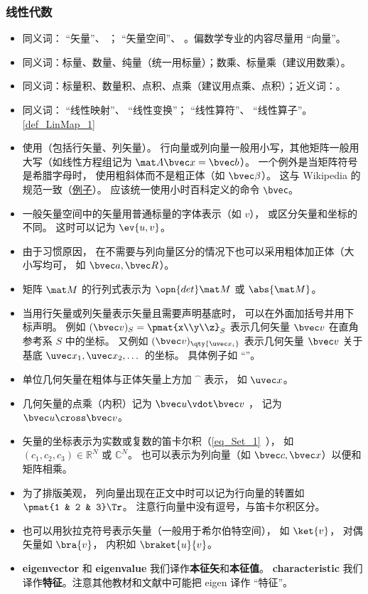 \subsubsection{线性代数}
\begin{itemize}
\item 同义词： “矢量”、 ； “矢量空间”、 。偏数学专业的内容尽量用 “向量”。
\item 同义词：标量、数量、纯量（统一用标量）；数乘、标量乘（建议用数乘）。
\item 同义词：标量积、数量积、点积、点乘（建议用点乘、点积）；近义词：。
\item 同义词： “线性映射”、 “线性变换”； “线性算符”、 “线性算子”。\autoref{def_LinMap_1}~
\item 使用（包括行矢量、列矢量）。 行向量或列向量一般用小写，其他矩阵一般用大写（如线性方程组记为 $\mat A \bvec x = \bvec b$）。 一个例外是当矩阵符号是希腊字母时， 使用粗斜体而不是粗正体（如 $\bvec \beta$）。 这与 Wikipedia 的规范一致（\href{https://en.wikipedia.org/wiki/Angular_acceleration}{例子}）。 应该统一使用小时百科定义的命令 \verb|\bvec|。
\item 一般矢量空间中的矢量用普通标量的字体表示（如 $v$）， 或区分矢量和坐标的不同。 这时可以记为 $\ev{u, v}$。
\item 由于习惯原因， 在不需要与列向量区分的情况下也可以采用粗体加正体（大小写均可， 如 $\bvec a, \bvec R$）。
\item 矩阵 $\mat M$ 的行列式表示为 $\opn{det}\mat M$ 或 $\abs{\mat M}$。
\item 当用行矢量或列矢量表示矢量且需要声明基底时， 可以在外面加括号并用下标声明。 例如 $(\bvec v)_S = \pmat{x\\y\\z}_S$ 表示几何矢量 $\bvec v$ 在直角参考系 $S$ 中的坐标。 又例如 $(\bvec v)_{\qty{\uvec x_i}}$ 表示几何矢量 $\bvec v$ 关于基底 $\uvec x_1, \uvec x_2, \dots$ 的坐标。 具体例子如 “”。
\item 单位几何矢量在粗体与正体矢量上方加 $\hat{\phantom{x}}$ 表示， 如 $\uvec x$。
\item 几何矢量的点乘（内积）记为 $\bvec u \vdot \bvec v$ ， 记为 $\bvec u \cross \bvec v$。
\item 矢量的坐标表示为实数或复数的笛卡尔积（\autoref{eq_Set_1}~）， 如 $(c_1, c_2, c_3) \in  \mathbb R^N$ 或 $\mathbb C^N$。 也可以表示为列向量（如 $\bvec c, \bvec x$）以便和矩阵相乘。
\item 为了排版美观， 列向量出现在正文中时可以记为行向量的转置如 $\pmat{1 & 2 & 3}\Tr$。 注意行向量中没有逗号，与笛卡尔积区分。
\item 也可以用狄拉克符号表示矢量（一般用于希尔伯特空间）， 如 $\ket{v}$， 对偶矢量如 $\bra{v}$， 内积如 $\braket{u}{v}$。
\item \textbf{eigenvector} 和 \textbf{eigenvalue} 我们译作\textbf{本征矢}和\textbf{本征值}。 \textbf{characteristic} 我们译作\textbf{特征}。注意其他教材和文献中可能把 eigen 译作 “特征”。
\end{itemize}


